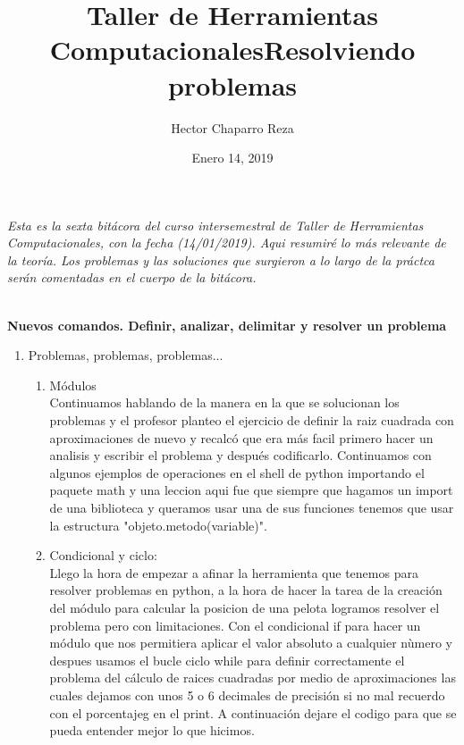 \documentclass[letterpaper, 12pt, oneside]{article}
\title{\Huge{Taller de Herramientas Computacionales}}
\author{Hector Chaparro Reza}
\date{Enero 14, 2019}
\begin{document}
	\maketitle
	\it Esta es la sexta bit\'acora del curso intersemestral de Taller de Herramientas Computacionales, con la fecha (14/01/2019). Aqui resumir\'e lo m\'as relevante de la teor\'ia. Los problemas y las soluciones que surgieron a lo largo de la pr\'actca ser\'an comentadas en el cuerpo de la bit\'acora.\\
	\newpage
	
	
	\title{\Huge{Resolviendo problemas}}\\
	
	\textbf{Nuevos comandos. Definir, analizar, delimitar y resolver un problema}\\
	
	\begin{enumerate}
		\item {Problemas, problemas, problemas...}
		\begin{enumerate}
			\item M\'odulos\\
			Continuamos hablando de la manera en la que se solucionan los problemas y el profesor planteo el ejercicio de definir la raiz cuadrada con aproximaciones de nuevo y recalcó que era más facil primero hacer un analisis y escribir el problema y después codificarlo. Continuamos con algunos ejemplos de operaciones en el shell de python importando el paquete math y una leccion aqui fue que siempre que hagamos un import de una biblioteca y queramos usar una de sus funciones tenemos que usar la estructura "objeto.metodo(variable)". \\
			
			\item Condicional y ciclo:\\
			Llego la hora de empezar a afinar la herramienta que tenemos para resolver problemas en python, a la hora de hacer la tarea de la creación del módulo para calcular la posicion de una pelota logramos resolver el problema pero con limitaciones. Con el condicional if para hacer un módulo que nos permitiera aplicar el valor absoluto a cualquier nùmero y despues usamos el bucle ciclo while para definir correctamente el problema del cálculo de raices cuadradas por medio de aproximaciones las cuales dejamos con unos 5 o 6 decimales de precisión si no mal recuerdo con el porcentajeg en el print. A continuación dejare el codigo para que se pueda entender mejor lo que hicimos.\\
			

\end{enumerate}
\end{enumerate}
\end{document}
